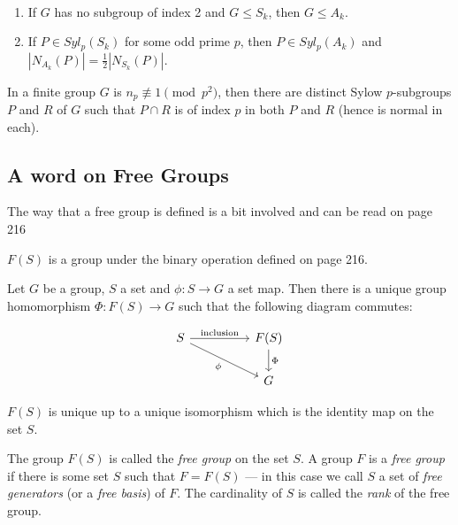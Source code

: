\documentclass[../main]{subfiles}
\begin{document}
\begin{prop}
 ~\begin{enumerate}
   \item If $G$ has no subgroup of index 2 and $G \leq S_k$, then $G \leq A_k$.
   
   \item If $P \in Syl_p(S_k)$ for some odd prime $p$, then $P \in Syl_p(A_k)$ and $|N_{A_k}(P)| = \frac{1}{2} |N_{S_k}(P)|$.
  \end{enumerate}
\end{prop}


\begin{lem}
 In a finite group $G$ is $n_p \not\equiv 1 \pmod{p^2}$, then there are distinct Sylow $p$-subgroups $P$ and $R$ of $G$ such that $P \cap R$ is of index $p$ in both $P$ and $R$ (hence is normal in each).
\end{lem}


\addtocounter{thm}{2}


\subsection{A word on Free Groups}


\begin{nt}
 The way that a free group is defined is a bit involved and can be read on page 216
\end{nt}


\begin{thm}
 $F(S)$ is a group under the binary operation defined on page 216.
\end{thm}


\begin{thm}
 Let $G$ be a group, $S$ a set and $\phi \colon S \to G$ a set map. Then there is a unique group homomorphism $\Phi \colon F(S) \to G$ such that the following diagram commutes:
 
 \[\begin{tikzcd}
	S && {F(S)} \\
	&& G
	\arrow["{\text{inclusion}}", from=1-1, to=1-3]
	\arrow["\phi"', from=1-1, to=2-3]
	\arrow["\Phi", from=1-3, to=2-3]
 \end{tikzcd}\]
\end{thm}


\begin{cor}
 $F(S)$ is unique up to a unique isomorphism which is the identity map on the set $S$.
\end{cor}


\begin{dfn}
 The group $F(S)$ is called the \textit{free group} on the set $S$. A group $F$ is a \textit{free group} if there is some set $S$ such that $F = F(S)$ --- in this case we call $S$ a set of \textit{free generators} (or a \textit{free basis}) of $F$. The cardinality of $S$ is called the \textit{rank} of the free group. 
\end{dfn}
\end{document}

